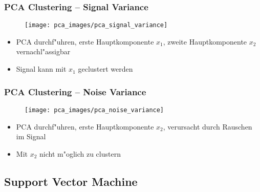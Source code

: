 
\begin{frame}

\frametitle{PCA Clustering -- Signal Variance}

\begin{figure}[h]
\centering
\texttt{[image: pca\_images/pca\_signal\_variance]}
\end{figure}

\begin{itemize}
\setlength{\itemsep}{7pt}
\item PCA durchf"uhren, erste Hauptkomponente $x_1$, zweite Hauptkomponente $x_2$ vernachl"assigbar
\item Signal kann mit $x_1$ geclustert werden
\end{itemize}

\end{frame}







\begin{frame}

\frametitle{PCA Clustering -- Noise Variance}

\begin{figure}[h]
\centering
\texttt{[image: pca\_images/pca\_noise\_variance]}
\end{figure}

\begin{itemize}
\setlength{\itemsep}{7pt}
\item PCA durchf"uhren, erste Hauptkomponente $x_2$, verursacht durch Rauschen im Signal
\item Mit $x_2$ nicht m"oglich zu clustern
\end{itemize}

\end{frame}



\subsection{Support Vector Machine}



